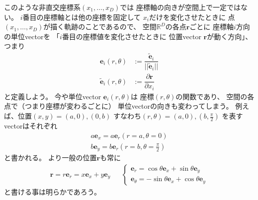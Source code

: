 このような非直交座標系$(x_1,\dots,x_D)$では
座標軸の向きが空間上で一定ではない。
$i$番目の座標軸とは他の座標を固定して
$x_i$だけを変化させたときに
点$(x_1,\dots,x_D)$が描く軌跡のことであるので、
空間$\mathbb{R}^D$の各点$\bm{r}$ごとに
座標軸$i$方向の単位vectorを
「$i$番目の座標値を変化させたときに
位置vector $\bm{r}$が動く方向」、つまり
\begin{subequations}
\begin{align}
  \bm{e}_i (r, \theta)
  &:=
  \dfrac{ \widetilde{\bm{e}}_i }
  { \big|\big| \tilde{\bm{e}}_i \big|\big| }
\\
  \widetilde{\bm{e}}_i (r, \theta)
  &:=
  \dfrac{\partial \bm{r}}{\partial x_i}
\end{align}
\end{subequations}
と定義しよう。
今や単位vector $\bm{e}_i (r, \theta)$は
座標$(r, \theta)$の関数であり、
空間の各点で（つまり座標が変わるごとに）
単位vectorの向きも変わってしまう。
例えば、位置$(x, y) = (a,0), (0,b)$
すなわち$(r, \theta) = (a, 0), (b, \frac{\pi}{2})$
を表すvectorはそれぞれ
\begin{subequations}
\begin{align}
  a \bm{e}_x
  = a \bm{e}_r (r=a, \theta = 0)
\\
  b \bm{e}_y
  = b \bm{e}_r (r=b, \theta = \frac{\pi}{2})
\end{align}
\end{subequations}
と書かれる。
より一般の位置$\bm{r}$も常に
\begin{align}
  \bm{r} = r \bm{e}_r
  = x \bm{e}_x + y \bm{e}_y
  &&
  \begin{cases}
    \bm{e}_r
  =
    \cos \theta \bm{e}_x
  +
    \sin \theta \bm{e}_y
  \\
    \bm{e}_\theta
  =
    - \sin \theta \bm{e}_x
  +
    \cos \theta \bm{e}_y
  \end{cases}
\end{align}
と書ける事は明らかであろう。

